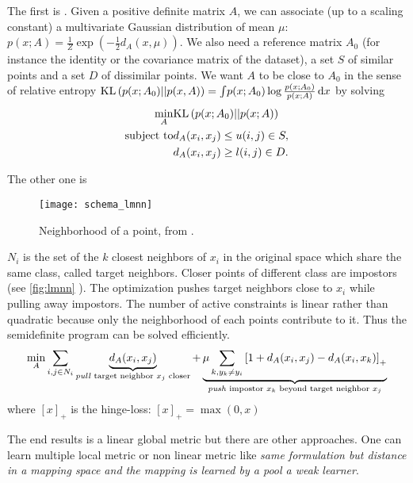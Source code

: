 The first is  \autocite{InfoMetric07}. Given a positive definite matrix $A$, we can associate (up to a scaling constant) a multivariate Gaussian distribution of mean $\mu$: $p(x; A) = \frac{1}{Z}\exp\left(-\frac{1}{2}d_A(x, \mu)\right)$. We also need a reference matrix $A_0$ (for instance the identity or the covariance matrix of the dataset), a set $S$ of similar points and a set $D$ of dissimilar points. We want $A$ to be close to $A_0$ in the sense of relative entropy $\mathrm{KL}\left(p(x; A_0)||p(x,A)\right) = \int \! p(x; A_0) \log\frac{p(x; A_0)}{p(x; A)}\, \mathrm{d}x$ by solving
\begin{align*}
        \min_A & \mathrm{KL}\left(p(x; A_0)||p(x; A)\right) \\
        \text{subject to} & d_A(x_i, x_j) \leq u (i,j) \in S,\\
                       & d_A(x_i, x_j) \geq l (i,j) \in D.
\end{align*}

The other one is  \autocite{LMNN09}
\begin{figure}[ht]
        \texttt{[image: schema\_lmnn]}
        \caption{Neighborhood of a point, from \autocite{LMNN09}.\label{fig:lmnn}}
\end{figure}
$N_i$ is the set of the $k$ closest neighbors of $x_i$ in the original space which share the same class, called target neighbors. Closer points of different class are impostors (see \autoref{fig:lmnn} ). The optimization pushes target neighbors close to $x_i$ while pulling away impostors.  The number of active constraints is linear rather than quadratic because only the neighborhood of each points contribute to it. Thus the semidefinite program can be solved efficiently.
\begin{equation}
        \min_A \sum_{i, j\in N_i} \underbrace{d_A(x_i, x_j)}_\text{\emph{pull} target neighbor $x_j$ closer}
        + \underbrace{\mu \sum_{k, y_k\neq y_i} \left[ 1 + d_A(x_i, x_j) - d_A(x_i, x_k)\right]_+}_\text{\emph{push} impostor $x_k$ beyond target neighbor $x_j$}
\end{equation}
where $[x]_+$ is the hinge-loss: $[x]_+=\max(0, x)$

The end results is a linear global metric but there are other approaches. One can learn multiple local metric or non linear metric like  \autocite{GBLMNN12} \emph{same formulation but distance in a mapping space and the mapping is learned by a pool a weak learner}.

